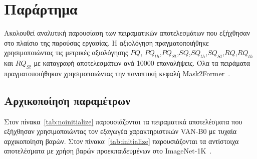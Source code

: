 \documentclass[12pt]{article}
\numberwithin{equation}{section}
\begin{document}
\newpage
\renewcommand{\refname}{Βιβλιογραφική αναφορά}


\newpage
\appendix
\section*{Παράρτημα}
{}
\makeatletter
\def\@currentlabelname{Παράρτημα}
\makeatother
\label{sec:parartima}

Ακολουθεί αναλυτική παρουσίαση των πειραματικών αποτελεσμάτων που εξήχθησαν στο πλαίσιο της παρούσας εργασίας. Η αξιολόγηση πραγματοποιήθηκε χρησιμοποιώντας τις μετρικές αξιολόγησης \(PQ\), \(PQ_{th}\),\(PQ_{St}\),\(SQ\),\(SQ_{th}\),\(SQ_{St}\),\(RQ\),\(RQ_{th}\) και \(RQ_{St}\) με καταγραφή αποτελεσμάτων ανά 10000 επαναλήψεις. Όλα τα πειράματα πραγματοποιήθηκαν χρησιμοποιώντας την πανοπτική κεφαλή Mask2Former~\cite{cheng2022maskedattentionmasktransformeruniversal}.  

\subsection*{\thesection\quad Αρχικοποίηση παραμέτρων}\label{app:A}

Στον πίνακα~\ref{tab:noinitialize} παρουσιάζονται τα πειραματικά αποτελέσματα που εξήχθησαν χρησιμοποιώντας τον εξαγωγέα χαρακτηριστικών VAN-B0 με τυχαία αρχικοποίηση βαρών. Στον πίνακα~\ref{tab:initialize} παρουσιάζονται τα αντίστοιχα αποτελέσματα με χρήση βαρών προεκπαιδευμένων στο ImageNet-1K~\cite{5206848}.
\end{document}
